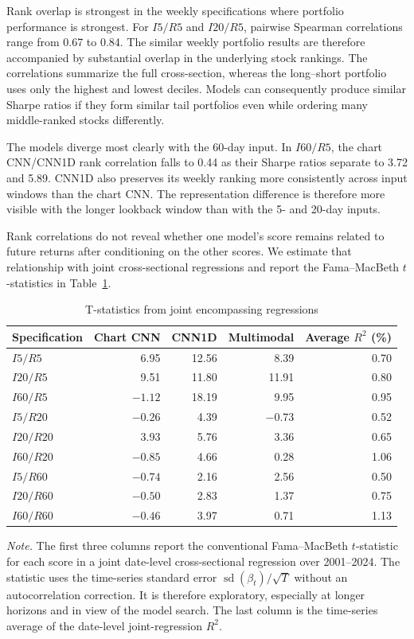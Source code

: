 Rank overlap is strongest in the weekly specifications where portfolio performance is strongest. For $I5/R5$ and $I20/R5$, pairwise Spearman correlations range from 0.67 to 0.84. The similar weekly portfolio results are therefore accompanied by substantial overlap in the underlying stock rankings. The correlations summarize the full cross-section, whereas the long--short portfolio uses only the highest and lowest deciles. Models can consequently produce similar Sharpe ratios if they form similar tail portfolios even while ordering many middle-ranked stocks differently.

The models diverge most clearly with the 60-day input. In $I60/R5$, the chart CNN/CNN1D rank correlation falls to 0.44 as their Sharpe ratios separate to 3.72 and 5.89. CNN1D also preserves its weekly ranking more consistently across input windows than the chart CNN. The representation difference is therefore more visible with the longer lookback window than with the 5- and 20-day inputs.

Rank correlations do not reveal whether one model's score remains related to future returns after conditioning on the other scores. We estimate that relationship with joint cross-sectional regressions and report the Fama--MacBeth $t$-statistics in Table~\ref{tab:joint_fmb}.

\begin{table}[htbp]
\centering
\caption{T-statistics from joint encompassing regressions}
\label{tab:joint_fmb}
\small
\setlength{\tabcolsep}{8pt}
\begin{tabular}{@{}lrrrr@{}}
\toprule
Specification & Chart CNN & CNN1D & Multimodal & Average $R^2$ (\%) \\
\midrule
$I5/R5$   & 6.95 & 12.56 & 8.39 & 0.70 \\
$I20/R5$  & 9.51 & 11.80 & 11.91 & 0.80 \\
$I60/R5$  & $-1.12$ & 18.19 & 9.95 & 0.95 \\
$I5/R20$  & $-0.26$ & 4.39 & $-0.73$ & 0.52 \\
$I20/R20$ & 3.93 & 5.76 & 3.36 & 0.65 \\
$I60/R20$ & $-0.85$ & 4.66 & 0.28 & 1.06 \\
$I5/R60$  & $-0.74$ & 2.16 & 2.56 & 0.50 \\
$I20/R60$ & $-0.50$ & 2.83 & 1.37 & 0.75 \\
$I60/R60$ & $-0.46$ & 3.97 & 0.71 & 1.13 \\
\bottomrule
\end{tabular}
\begin{minipage}{\textwidth}
\footnotesize\textit{Note.} The first three columns report the conventional Fama--MacBeth $t$-statistic for each score in a joint date-level cross-sectional regression over 2001--2024. The statistic uses the time-series standard error $\operatorname{sd}(\beta_t)/\sqrt{T}$ without an autocorrelation correction. It is therefore exploratory, especially at longer horizons and in view of the model search. The last column is the time-series average of the date-level joint-regression $R^2$.
\end{minipage}
\end{table}

